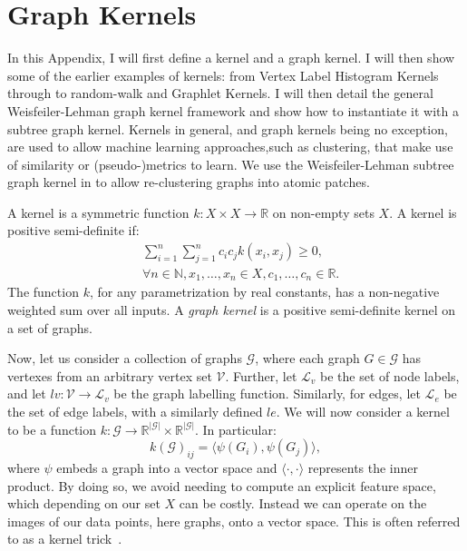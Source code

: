 \chapter{Graph Kernels}
\label{appendix:graph_kernels}

In this Appendix, I will first define a kernel and a graph kernel. I will then
show some of the earlier examples of kernels: from Vertex Label Histogram
Kernels through to random-walk and Graphlet Kernels. I will then detail the
general Weisfeiler-Lehman graph kernel framework and show how to instantiate it
with a subtree graph kernel. Kernels in general, and graph kernels being no
exception, are used to allow machine learning approaches,such as clustering,
that make use of similarity or (pseudo-)metrics to learn. We use the
Weisfeiler-Lehman subtree graph kernel in  to allow
re-clustering \deltaPDGN graphs into atomic patches.

A kernel is a symmetric function $k: X \times X \rightarrow \mathbb{R}$ on
non-empty sets $X$. A kernel is positive semi-definite if:
\begin{align*}
	&\sum_{i=1}^{n} \sum_{j=1}^{n} c_i c_j k(x_i, x_j) \geq 0, \\
	&\forall n \in \mathbb{N}, x_1, \ldots, x_n \in X, c_1, \ldots, c_n \in \mathbb{R}. 
\end{align*}
The function $k$, for any
parametrization by real constants, has a non-negative weighted sum over all
inputs. A \emph{graph kernel} is a positive semi-definite kernel on a set of graphs.

Now, let us consider a collection of graphs $\mathcal{G}$, where each graph $G
\in \mathcal{G}$ has vertexes from an arbitrary vertex set $\mathcal{V}$.
Further, let $\mathcal{L}_v$ be the set of node labels, and let $lv:
\mathcal{V} \rightarrow \mathcal{L}_v$ be the graph labelling function.
Similarly, for edges, let $\mathcal{L}_e$ be the set of edge labels, with a
similarly defined $le$. We will now consider a kernel to be a function
$k: \mathcal{G} \rightarrow \mathbb{R}^{|\mathcal{G}|} \times
\mathbb{R}^{|\mathcal{G}|}$. In particular:
\begin{equation}
\label{eq:kernel_general}
    k(\mathcal{G})_{ij} = \langle\psi(G_i), \psi(G_j)\rangle,
\end{equation}
%
where $\psi$ embeds a graph into a vector space and $\langle\cdot,\cdot\rangle$
represents the inner product. By doing so, we avoid needing to compute an
explicit feature space, which depending on our set $X$ can be costly. Instead we
can operate on the images of our data points, here graphs, onto a vector space.
This is often referred to as a kernel trick~\cite{theodoridis2008}.


